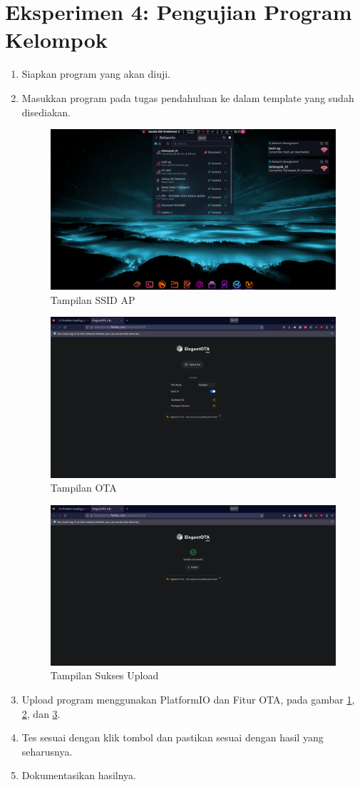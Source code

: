\section{Eksperimen 4: Pengujian Program Kelompok}
\begin{enumerate}
    \item Siapkan program yang akan diuji.
    
    \item Masukkan program pada tugas pendahuluan ke dalam template yang sudah disediakan.
    \begin{figure}[H]
        \centering
        \includegraphics[width=0.4\linewidth]{P4/img/11_tampilan_ssid_ap_ketika_sudah_berhasil_diflash.png}
        \caption{Tampilan SSID AP}
        \label{fig:TampilanSSIDAP}
    \end{figure}
    \begin{figure}[H]
        \centering
        \includegraphics[width=0.4\linewidth]{P4/img/12_tampilan_ota_siap_upload.png}
        \caption{Tampilan OTA}
        \label{fig:TampilanOTA}
    \end{figure}
    \begin{figure}[H]
        \centering
        \includegraphics[width=0.4\linewidth]{P4/img/13_tampilan_ota_sukses_upload.png}
        \caption{Tampilan Sukses Upload}
        \label{fig:TampilaSuksesUpload}
    \end{figure}
    \item Upload program menggunakan PlatformIO dan Fitur OTA, pada gambar \ref{fig:TampilanSSIDAP}, \ref{fig:TampilanOTA}, dan \ref{fig:TampilaSuksesUpload}.
    \item Tes sesuai dengan klik tombol dan pastikan sesuai dengan hasil yang seharusnya.
    \item Dokumentasikan hasilnya.
\end{enumerate}

